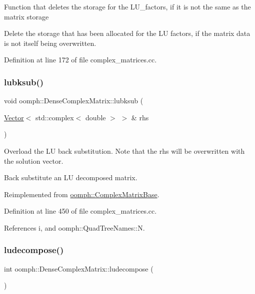 Function that deletes the storage for the L\+U\+\_\+factors, if it is not the same as the matrix storage

Delete the storage that has been allocated for the LU factors, if the matrix data is not itself being overwritten. 

Definition at line 172 of file complex\+\_\+matrices.\+cc.

\mbox{\label{classoomph_1_1DenseComplexMatrix_abcd909e71bdcae1059eb8779de72a99d}} 
\subsubsection{\texorpdfstring{lubksub()}{lubksub()}}
{\footnotesize\ttfamily void oomph\+::\+Dense\+Complex\+Matrix\+::lubksub (\begin{DoxyParamCaption}\item[{\hyperlink{classoomph_1_1Vector}{Vector}$<$ std\+::complex$<$ double $>$ $>$ \&}]{rhs }\end{DoxyParamCaption})\hspace{0.3cm}{\ttfamily [virtual]}}



Overload the LU back substitution. Note that the rhs will be overwritten with the solution vector. 

Back substitute an LU decomposed matrix. 

Reimplemented from \hyperlink{classoomph_1_1ComplexMatrixBase_aa0e444d60d4ec9e35a6903ab88baaf62}{oomph\+::\+Complex\+Matrix\+Base}.



Definition at line 450 of file complex\+\_\+matrices.\+cc.



References i, and oomph\+::\+Quad\+Tree\+Names\+::N.

\mbox{\label{classoomph_1_1DenseComplexMatrix_a8503c0e46409613c58261ce6136f88b9}} 
\subsubsection{\texorpdfstring{ludecompose()}{ludecompose()}}
{\footnotesize\ttfamily int oomph\+::\+Dense\+Complex\+Matrix\+::ludecompose (\begin{DoxyParamCaption}{ }\end{DoxyParamCaption})\hspace{0.3cm}{\ttfamily [virtual]}}



